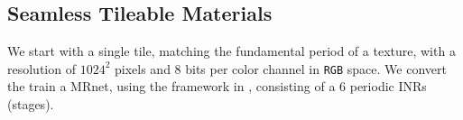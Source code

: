 \subsection{Seamless Tileable Materials}\label{s-multires-2d}

We start with a single tile, matching the fundamental period of a texture, with a resolution of $1024^2$ pixels and $8$ bits per color channel in \texttt{RGB} space. We convert the  train a MRnet, using the framework in \cite{paz2023mr}, consisting of a $6$ periodic INRs (stages).



